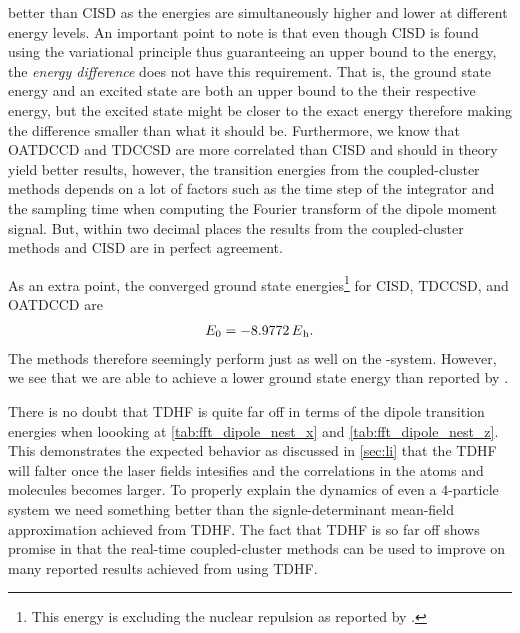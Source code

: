         better than CISD as the energies are simultaneously higher and lower at
        different energy levels.
        An important point to note is that even though CISD is found using the
        variational principle thus guaranteeing an upper bound to the energy,
        the \emph{energy difference} does not have this requirement.
        That is, the ground state energy and an excited state are both an upper
        bound to the their respective energy, but the excited state might be
        closer to the exact energy therefore making the difference smaller than
        what it should be.
        Furthermore, we know that OATDCCD and TDCCSD are more correlated than
        CISD and should in theory yield better results, however, the transition
        energies from the coupled-cluster methods depends on a lot of factors
        such as the time step of the integrator and the sampling time when
        computing the Fourier transform of the dipole moment signal.
        But, within two decimal places the results from the coupled-cluster
        methods and CISD are in perfect agreement.

        As an extra point, the converged ground state energies\footnote{%
            This energy is excluding the nuclear repulsion as reported by
            \citeauthor{nest} \cite{nest}.
        } for CISD, TDCCSD, and OATDCCD are
        \begin{align}
            \energy_0 = \SI{-8.9772}{\hartree}.
        \end{align}
        The methods therefore seemingly perform just as well on the
        -system.
        However, we see that we are able to achieve a lower ground state energy
        than reported by \citeauthor{nest}.

        There is no doubt that TDHF is quite far off in terms of the dipole
        transition energies when loooking at \autoref{tab:fft_dipole_nest_x} and
        \autoref{tab:fft_dipole_nest_z}.
        This demonstrates the expected behavior as discussed in \autoref{sec:li}
        that the TDHF will falter once the laser fields intesifies and the
        correlations in the atoms and molecules becomes larger.
        To properly explain the dynamics of even a $4$-particle system we need
        something better than the signle-determinant mean-field approximation
        achieved from TDHF.
        The fact that TDHF is so far off shows promise in that the real-time
        coupled-cluster methods can be used to improve on many reported results
        achieved from using TDHF.


